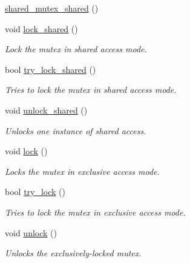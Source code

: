 \begin{DoxyCompactItemize}
\item 
\hyperlink{classcpen333_1_1thread_1_1impl_1_1shared__mutex__shared_a36db88415158bfa99efca5b8bbc70533}{shared\+\_\+mutex\+\_\+shared} ()
\item 
void \hyperlink{classcpen333_1_1thread_1_1impl_1_1shared__mutex__shared_a16b3ba22ee6190696e7c333379e786d3}{lock\+\_\+shared} ()
\begin{DoxyCompactList}\small\item\em Lock the mutex in shared access mode. \end{DoxyCompactList}\item 
bool \hyperlink{classcpen333_1_1thread_1_1impl_1_1shared__mutex__shared_a147d8ab59cf14fd567135542c2302c4f}{try\+\_\+lock\+\_\+shared} ()
\begin{DoxyCompactList}\small\item\em Tries to lock the mutex in shared access mode. \end{DoxyCompactList}\item 
void \hyperlink{classcpen333_1_1thread_1_1impl_1_1shared__mutex__shared_afba02f4b80ffa817aaa124fa4418465d}{unlock\+\_\+shared} ()
\begin{DoxyCompactList}\small\item\em Unlocks one instance of shared access. \end{DoxyCompactList}\item 
void \hyperlink{classcpen333_1_1thread_1_1impl_1_1shared__mutex__shared_ab38a0ee8010e85192efb9544aa460310}{lock} ()
\begin{DoxyCompactList}\small\item\em Locks the mutex in exclusive access mode. \end{DoxyCompactList}\item 
bool \hyperlink{classcpen333_1_1thread_1_1impl_1_1shared__mutex__shared_af7503e29c3774dad7db5c7bfffa4d6dc}{try\+\_\+lock} ()
\begin{DoxyCompactList}\small\item\em Tries to lock the mutex in exclusive access mode. \end{DoxyCompactList}\item 
void \hyperlink{classcpen333_1_1thread_1_1impl_1_1shared__mutex__shared_aa7e6c6ac6bbd3b72ada12d9f178c0cdd}{unlock} ()
\begin{DoxyCompactList}\small\item\em Unlocks the exclusively-\/locked mutex. \end{DoxyCompactList}\item 

\end{DoxyCompactItemize}
